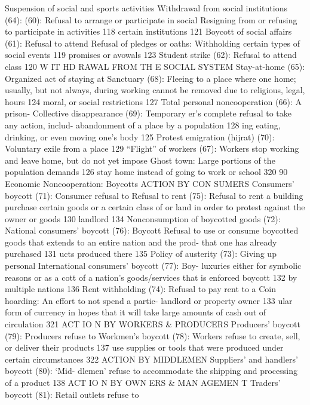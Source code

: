 \documentclass[twoside,a4paper,12pt,fleqn,openany]{extbook}
\begin{document}
Suspension of social and sports activities
 Withdrawal from social institutions (64):
(60): Refusal to arrange or participate in social
 Resigning from or refusing to participate in
activities
 118
 certain institutions
 121
Boycott of social affairs (61): Refusal to attend
 Refusal of pledges or oaths: Withholding
certain types of social events
 119
 promises or avowals
 123
Student strike (62): Refusal to attend class		
120
W IT HD RAWAL FROM TH E SOCIAL SYSTEM
Stay-at-home (65): Organized act of staying at
 Sanctuary (68): Fleeing to a place where one
home; usually, but not always, during working
 cannot be removed due to religious, legal,
hours
 124
 moral, or social restrictions
 127
Total personal noncooperation (66): A prison-
 Collective disappearance (69): Temporary
er’s complete refusal to take any action, includ-
 abandonment of a place by a population 128
ing eating, drinking, or even moving one’s
body
 125
 Protest emigration (hijrat) (70): Voluntary exile
from a place
 129
“Flight” of workers (67): Workers stop working
and leave home, but do not yet impose
 Ghost town: Large portions of the population
demands
 126
 stay home instead of going to work or school		
320
90
Economic Noncooperation: Boycotts
ACTION BY CON SUMERS
Consumers’ boycott (71): Consumer refusal to
 Refusal to rent (75): Refusal to rent a building
purchase certain goods or a certain class of
 or land in order to protest against the owner or
goods
 130
 landlord
 134
Nonconsumption of boycotted goods (72):
 National consumers’ boycott (76): Boycott
Refusal to use or consume boycotted goods
 that extends to an entire nation and the prod-
that one has already purchased
 131
 ucts produced there
 135
Policy of austerity (73): Giving up personal
 International consumers’ boycott (77): Boy-
luxuries either for symbolic reasons or as a
 cott of a nation’s goods/services that is enforced
boycott
 132
 by multiple nations
 136
Rent withholding (74): Refusal to pay rent to a
 Coin hoarding: An effort to not spend a partic-
landlord or property owner
 133
 ular form of currency in hopes that it will take
large amounts of cash out of circulation 321
ACT IO N BY WORKERS & PRODUCERS
Producers’ boycott (79): Producers refuse to
 Workmen’s boycott (78): Workers refuse to
create, sell, or deliver their products
 137
 use supplies or tools that were produced under
certain circumstances
 322
ACTION BY MIDDLEMEN
Suppliers’ and handlers’ boycott (80): ‘Mid-
dlemen’ refuse to accommodate the shipping
and processing of a product
 138
ACT IO N BY OWN ERS & MAN AGEMEN T
Traders’ boycott (81): Retail outlets refuse to
\end{document}
